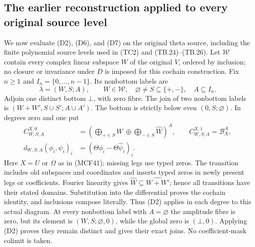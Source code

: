 
\subsection{The earlier reconstruction applied to every original source level}
\label{sec:support-propagated-original-levels}

We now evaluate (D2), (D6), and (D7) on the original theta source,
including the finite polynomial source levels used in (TC2) and
(TB.24)--(TB.26).  Let $\mathcal W$ contain every complex linear
subspace $W$ of the original $V$, ordered by inclusion; no closure
or invariance under $D$ is imposed for this cochain construction.
Fix $n\geq1$ and $I_n=\{0,\ldots,n-1\}$.  Its nonbottom labels are
\[
\lambda=(W,S;A),\qquad W\in\mathcal W,
\quad\varnothing\ne S\subseteq\{+,-\},\quad A\subseteq I_n.
\tag{D9}
\]
Adjoin one distinct bottom $\bot$, with zero fibre.  The join of two
nonbottom labels is $(W+W',S\cup S';A\cup A')$.  The bottom is
strictly below even $(0,S;\varnothing)$.  In degrees zero and one put
\[
\begin{split}
C_{W,S;A}^{X,0}&=
 \left(\bigoplus_{+\in S}W\ \oplus\!
       \bigoplus_{-\in S}\widehat W\right)^A,
\qquad C_{W,S;A}^{X,1}=\mathscr B_X^A,\\
d_{W,S;A}(\phi_i,\psi_i)_i&=(\Theta\phi_i-\Theta\widehat\psi_i)_i.
\end{split}
\tag{D10}
\]
Here $X=U$ or $\Omega$ as in (MCF41); missing legs use typed zeros.
The transition includes old subspaces and coordinates and inserts
typed zeros in newly present legs or coefficients.  Fourier
linearity gives $\widehat W\subseteq\widehat{W+W'}$; hence all
transitions have their stated domains.  Substitution into the
differential proves the cochain identity, and inclusions compose
literally.  Thus (D2) applies in each degree to this actual diagram.
At every nonbottom label with $A=\varnothing$ the amplitude fibre
is zero, but its element is $(W,S;\varnothing,0)$, while the global
zero is $(\bot,0)$.  Applying (D2) proves they remain distinct and
gives their exact joins.  No coefficient-mask colimit is taken.

